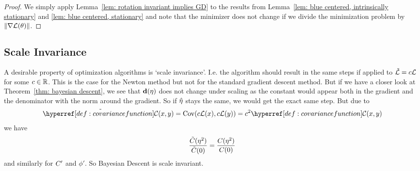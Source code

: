 \begin{proof}
	We simply apply Lemma~\ref{lem: rotation invariant implies GD}	to the results
	from Lemma~\ref{lem: blue centered, intrinsically stationary} and \ref{lem:
	blue centered, stationary} and note that the minimizer does not change if
	we divide the minimization problem by \(\|\nabla\mathcal{L}(\theta)\|\).
\end{proof}

\subsection{Scale Invariance}

A desirable property of optimization algorithms is `scale invariance'. I.e.
the algorithm should result in the same steps if applied to
\(\tilde{\mathcal{L}}=c\mathcal{L}\) for some \(c\in\mathbb{R}\). This is the case for the
Newton method but not for the standard gradient descent method. But if we have
a closer look at Theorem~\ref{thm: bayesian descent}, we see that
\(\mathbf{d}(\eta)\) does not change under scaling as the constant would appear both
in the gradient and the denominator with the norm around the gradient. So
if \(\hat{\eta}\) stays the same, we would get the exact same step. But
due to
\begin{equation*}
	\tilde{\C}(x,y) = \Cov(c\Loss(x), c\Loss(y)) = c^2 \C(x,y)
\end{equation*}
we have
\begin{equation*}
	\frac{\tilde{C}(\eta^2)}{\tilde{C}(0)}=\frac{C(\eta^2)}{C(0)}
\end{equation*}
and similarly for \(C'\) and \(\phi'\). So Bayesian Descent is scale
invariant.

